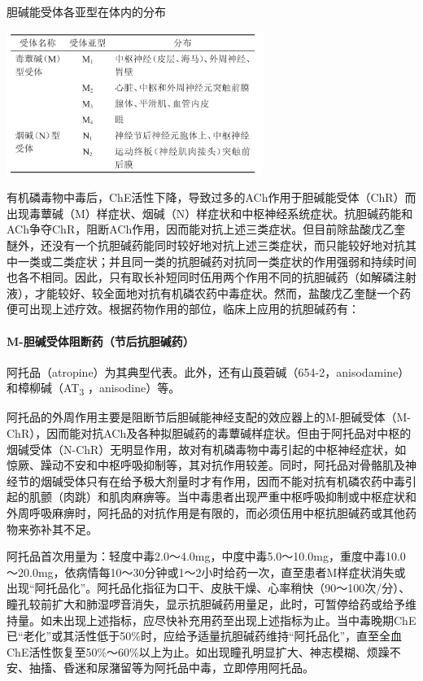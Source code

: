\begin{table}[htbp]
\centering
\caption{胆碱能受体各亚型在体内的分布}
\label{tab55-6}
\includegraphics[width=3.27083in,height=1.83333in]{./images/Image00208.jpg}
\end{table}

有机磷毒物中毒后，ChE活性下降，导致过多的ACh作用于胆碱能受体（ChR）而出现毒蕈碱（M）样症状、烟碱（N）样症状和中枢神经系统症状。抗胆碱药能和ACh争夺ChR，阻断ACh作用，因而能对抗上述三类症状。但目前除盐酸戊乙奎醚外，还没有一个抗胆碱药能同时较好地对抗上述三类症状，而只能较好地对抗其中一类或二类症状；并且同一类的抗胆碱药对抗同一类症状的作用强弱和持续时间也各不相同。因此，只有取长补短同时伍用两个作用不同的抗胆碱药（如解磷注射液），才能较好、较全面地对抗有机磷农药中毒症状。然而，盐酸戊乙奎醚一个药便可出现上述疗效。根据药物作用的部位，临床上应用的抗胆碱药有：

\paragraph{M-胆碱受体阻断药（节后抗胆碱药）}

阿托品（atropine）为其典型代表。此外，还有山莨菪碱（654-2，anisodamine）和樟柳碱（AT\textsubscript{3}
，anisodine）等。

阿托品的外周作用主要是阻断节后胆碱能神经支配的效应器上的M-胆碱受体（M-ChR），因而能对抗ACh及各种拟胆碱药的毒蕈碱样症状。但由于阿托品对中枢的烟碱受体（N-ChR）无明显作用，故对有机磷毒物中毒引起的中枢神经症状，如惊厥、躁动不安和中枢呼吸抑制等，其对抗作用较差。同时，阿托品对骨骼肌及神经节的烟碱受体只有在给予极大剂量时才有作用，因而不能对抗有机磷农药中毒引起的肌颤（肉跳）和肌肉麻痹等。当中毒患者出现严重中枢呼吸抑制或中枢症状和外周呼吸麻痹时，阿托品的对抗作用是有限的，而必须伍用中枢抗胆碱药或其他药物来弥补其不足。

阿托品首次用量为：轻度中毒2.0～4.0mg，中度中毒5.0～10.0mg，重度中毒10.0～20.0mg，依病情每10～30分钟或1～2小时给药一次，直至患者M样症状消失或出现“阿托品化”。阿托品化指征为口干、皮肤干燥、心率稍快（90～100次/分）、瞳孔较前扩大和肺湿啰音消失，显示抗胆碱药用量足，此时，可暂停给药或给予维持量。如未出现上述指标，应尽快补充用药至出现上述指标为止。当中毒晚期ChE已“老化”或其活性低于50\%时，应给予适量抗胆碱药维持“阿托品化”，直至全血ChE活性恢复至50\%～60\%以上为止。如出现瞳孔明显扩大、神志模糊、烦躁不安、抽搐、昏迷和尿潴留等为阿托品中毒，立即停用阿托品。

